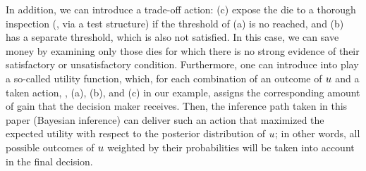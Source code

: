 In addition, we can introduce a trade-off action: (c) expose the die to a thorough inspection (\eg, via a test structure) if the threshold of (a) is no reached, and (b) has a separate threshold, which is also not satisfied. In this case, we can save money by examining only those dies for which there is no strong evidence of their satisfactory or unsatisfactory condition. Furthermore, one can introduce into play a so-called utility function, which, for each combination of an outcome of $u$ and a taken action, \ie, (a), (b), and (c) in our example, assigns the corresponding amount of gain that the decision maker receives. Then, the inference path taken in this paper (Bayesian inference) can deliver such an action that maximized the expected utility with respect to the posterior distribution of $u$; in other words, all possible outcomes of $u$ weighted by their probabilities will be taken into account in the final decision.
